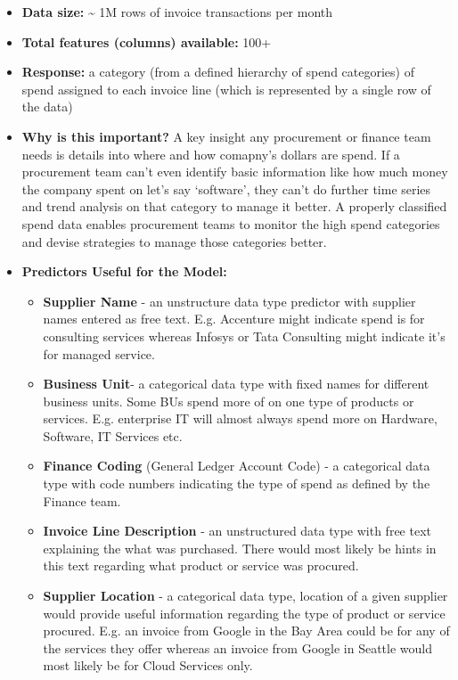 \documentclass[
]{article}
\providecommand{\tightlist}{%
  \setlength{\itemsep}{0pt}\setlength{\parskip}{0pt}}
\begin{document}
\begin{itemize}
\tightlist
\item
  \textbf{Data size:} \textasciitilde{} 1M rows of invoice transactions
  per month
\item
  \textbf{Total features (columns) available:} 100+
\item
  \textbf{Response:} a category (from a defined hierarchy of spend
  categories) of spend assigned to each invoice line (which is
  represented by a single row of the data)
\item
  \textbf{Why is this important?} A key insight any procurement or
  finance team needs is details into where and how comapny's dollars are
  spend. If a procurement team can't even identify basic information
  like how much money the company spent on let's say `software', they
  can't do further time series and trend analysis on that category to
  manage it better. A properly classified spend data enables procurement
  teams to monitor the high spend categories and devise strategies to
  manage those categories better.
\item
  \textbf{Predictors Useful for the Model:}

  \begin{itemize}
  \tightlist
  \item
    \textbf{Supplier Name} - an unstructure data type predictor with
    supplier names entered as free text. E.g. Accenture might indicate
    spend is for consulting services whereas Infosys or Tata Consulting
    might indicate it's for managed service.
  \item
    \textbf{Business Unit}- a categorical data type with fixed names for
    different business units. Some BUs spend more of on one type of
    products or services. E.g. enterprise IT will almost always spend
    more on Hardware, Software, IT Services etc.
  \item
    \textbf{Finance Coding} (General Ledger Account Code) - a
    categorical data type with code numbers indicating the type of spend
    as defined by the Finance team.
  \item
    \textbf{Invoice Line Description} - an unstructured data type with
    free text explaining the what was purchased. There would most likely
    be hints in this text regarding what product or service was
    procured.
  \item
    \textbf{Supplier Location} - a categorical data type, location of a
    given supplier would provide useful information regarding the type
    of product or service procured. E.g. an invoice from Google in the
    Bay Area could be for any of the services they offer whereas an
    invoice from Google in Seattle would most likely be for Cloud
    Services only.
  \end{itemize}
\end{itemize}
\end{document}
